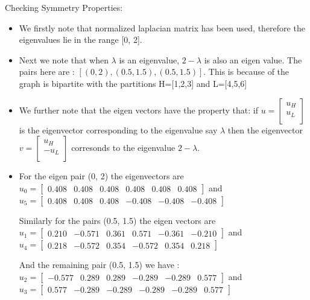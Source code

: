 \documentclass{article}
\begin{document}
Checking Symmetry Properties:
\begin{itemize}
\item We firstly note that normalized laplacian matrix has been used, therefore the eigenvalues lie in the range [0, 2].
\item Next we note that when $\lambda$ is an eigenvalue, $2-\lambda$ is also an eigen value. The pairs here are : $[(0, 2), (0.5, 1.5), (0.5, 1.5)]$. This is because of the graph is bipartite with the partitions H=[1,2,3] and L=[4,5,6]
\item We further note that the eigen vectors have the property that: if
  $u = \begin{bmatrix}
    u_H \\
    u_L \\
  \end{bmatrix}$
  is the eigenvector corresponding to the eigenvalue say $\lambda$ then the eigenvector
  $v =
  \begin{bmatrix}
    u_H \\
    -u_L\\
  \end{bmatrix}$
  corresonds to the eigenvalue $2-\lambda$.
\item For the eigen pair (0, 2) the eigenvectors are
  $u_0 =
  \begin{bmatrix}
      0.408 & 0.408 & 0.408 & 0.408 & 0.408 & 0.408
    \end{bmatrix}$
    and
    $u_5 =
    \begin{bmatrix}
        0.408 & 0.408 & 0.408 & -0.408 & -0.408 & -0.408
    \end{bmatrix}$

    Similarly for the pairs (0.5, 1.5) the eigen vectors are
    $u_1 =
    \begin{bmatrix}
      0.210 & -0.571 & 0.361 & 0.571 & -0.361 & -0.210
    \end{bmatrix}$
    and
    $u_4 =
    \begin{bmatrix}
      0.218 & -0.572 & 0.354 & -0.572 & 0.354 & 0.218
    \end{bmatrix}$

    And the remaining pair (0.5, 1.5) we have :
    $u_2 =
    \begin{bmatrix}
      -0.577 & 0.289 & 0.289 & -0.289 & -0.289 & 0.577
    \end{bmatrix}$
    and
    $u_3 =
    \begin{bmatrix}
        0.577 & -0.289 & -0.289 & -0.289 & -0.289 & 0.577
    \end{bmatrix}$


\end{itemize}
\end{document}

